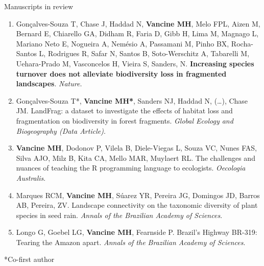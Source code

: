 \documentclass{resume}
\begin{document}
\begin{rSection}{Manuscripts in review}
\begin{enumerate}
\item Gonçalves-Souza T, Chase J, Haddad N, {\bf Vancine MH}, Melo FPL, Aizen M, Bernard E, Chiarello GA, Didham R, Faria D, Gibb H, Lima M, Magnago L, Mariano Neto E, Nogueira A, Nemésio A, Passamani M, Pinho BX, Rocha-Santos L, Rodrigues R, Safar N, Santos B, Soto-Werschitz A, Tabarelli M, Uehara-Prado M, Vasconcelos H, Vieira S, Sanders, N. {\bf Increasing species turnover does not alleviate biodiversity loss in fragmented landscapes}. {\it Nature.}

\item Gonçalves-Souza T*, {\bf Vancine MH*}, Sanders NJ, Haddad N, (…), Chase JM. LandFrag: a dataset to investigate the effects of habitat loss and fragmentation on biodiversity in forest fragments. {\it Global Ecology and Biogeography (Data Article)}.

\item {\bf Vancine MH}, Dodonov P, Vilela B, Diele-Viegas L, Souza VC, Nunes FAS, Silva AJO, Milz B, Kita CA, Mello MAR, Muylaert RL. The challenges and nuances of teaching the R programming language to ecologists. {\it Oecologia Australis}.

\item Marques RCM, {\bf Vancine MH}, Súarez YR, Pereira JG, Domingos JD, Barros AB, Pereira, ZV. Landscape connectivity on the taxonomic diversity of plant species in seed rain. {\it Annals of the Brazilian Academy of Sciences}.

\item Longo G, Goebel LG, {\bf Vancine MH}, Fearnside P. Brazil’s Highway BR-319: Tearing the Amazon apart. {\it Annals of the Brazilian Academy of Sciences}.

\end{enumerate} 

*Co-first author

\end{rSection}

\end{document}
